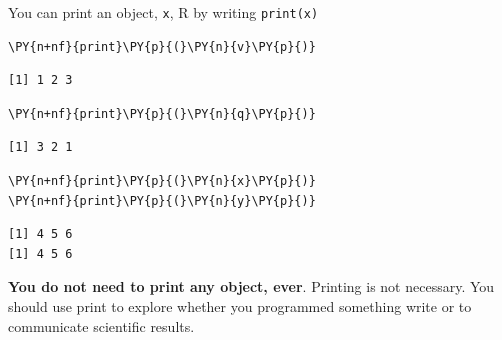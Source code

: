 You can print an object, \texttt{x}, R by writing \texttt{print(x)}

    \begin{tcolorbox}[breakable, size=fbox, boxrule=1pt, pad at break*=1mm,colback=cellbackground, colframe=cellborder]
\begin{Verbatim}[commandchars=\\\{\}]
\PY{n+nf}{print}\PY{p}{(}\PY{n}{v}\PY{p}{)}
\end{Verbatim}
\end{tcolorbox}

    \begin{Verbatim}[commandchars=\\\{\}]
[1] 1 2 3
    \end{Verbatim}

    \begin{tcolorbox}[breakable, size=fbox, boxrule=1pt, pad at break*=1mm,colback=cellbackground, colframe=cellborder]
\begin{Verbatim}[commandchars=\\\{\}]
\PY{n+nf}{print}\PY{p}{(}\PY{n}{q}\PY{p}{)}
\end{Verbatim}
\end{tcolorbox}

    \begin{Verbatim}[commandchars=\\\{\}]
[1] 3 2 1
    \end{Verbatim}

    \begin{tcolorbox}[breakable, size=fbox, boxrule=1pt, pad at break*=1mm,colback=cellbackground, colframe=cellborder]
\begin{Verbatim}[commandchars=\\\{\}]
\PY{n+nf}{print}\PY{p}{(}\PY{n}{x}\PY{p}{)}
\PY{n+nf}{print}\PY{p}{(}\PY{n}{y}\PY{p}{)}
\end{Verbatim}
\end{tcolorbox}

    \begin{Verbatim}[commandchars=\\\{\}]
[1] 4 5 6
[1] 4 5 6
    \end{Verbatim}

    \textbf{You do not need to print any object, ever}. Printing is not
necessary. You should use print to explore whether you programmed
something write or to communicate scientific results.

